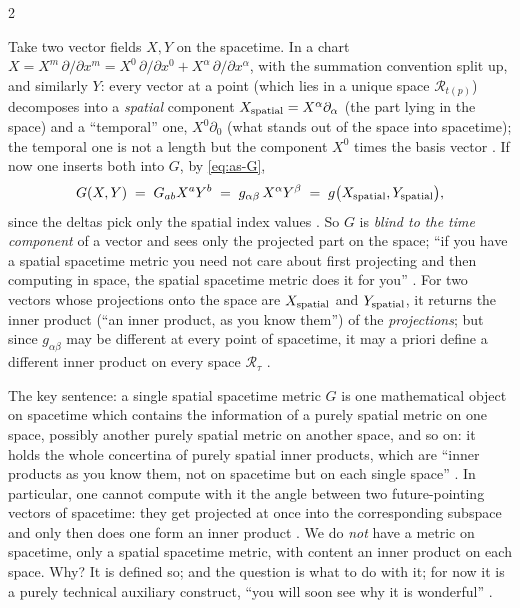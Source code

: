 \begin{paracol}{2}
\begin{intuition}\label{int:as-G}
Take two vector fields $X,Y$ on the spacetime. In a chart $X=X^m\,\partial/\partial x^m=X^0\,\partial/\partial x^0+X^\alpha\,\partial/\partial x^\alpha$, with the summation convention split up, and similarly $Y$: every vector at a point
(which lies in a unique space $\mathcal R_{t(p)}$) decomposes into a \emph{spatial} component $X_{\rm spatial}=X^\alpha\partial_\alpha$ (the part lying in the space) and a ``temporal'' one, $X^0\partial_0$
(what stands out of the space into spacetime); the temporal one is not a length but the component $X^0$ times the basis vector . If now one inserts both into $G$, by \eqref{eq:as-G},
\begin{equation}\label{eq:as-G-projection}
  G(X,Y)\;=\;G_{ab}X^aY^b\;=\;g_{\alpha\beta}\,X^\alpha Y^\beta\;=\;g\bigl(X_{\rm spatial},Y_{\rm spatial}\bigr),
\end{equation}
since the deltas pick only the spatial index values . So $G$ is \emph{blind to the time component} of a vector and sees only the projected part on the space; ``if you have a spatial spacetime metric you need not care about first projecting and then computing in space, the spatial spacetime metric does it for you''
. For two vectors whose projections onto the space are $X_{\rm spatial}$ and $Y_{\rm spatial}$, it returns the inner product (``an inner product, as you know them'') of the \emph{projections}; but since $g_{\alpha\beta}$ may be different at every
point of spacetime, it may a priori define a different inner product on every space $\mathcal R_\tau$ .
\end{intuition}
The key sentence: a single spatial spacetime metric $G$ is one mathematical object on spacetime which contains the information of a purely spatial metric on one space, possibly another purely spatial metric on another space, and so on: it holds the whole concertina of
purely spatial inner products, which are ``inner products as you know them, not on spacetime but on each single space'' . In particular, one cannot compute with it the angle between two future-pointing vectors of spacetime: they get projected at once into the corresponding
subspace and only then does one form an inner product . We do \emph{not} have a metric on spacetime, only a spatial spacetime metric, with content an inner product on each space. Why? It is defined so; and the question is what to do with it; for now it is a purely technical
auxiliary construct, ``you will soon see why it is wonderful'' .


\end{paracol}
